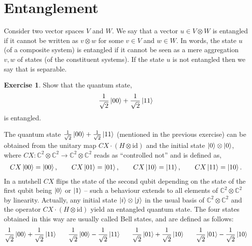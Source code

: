 \documentclass[a4paper, 11pt]{article}
\newcommand{\complex}{\mathbb{C}}
\newcommand{\id}{\mathrm{id}}
\theoremstyle{definition}
\newtheorem{exercise}{Exercise}
\begin{document}
\section{Entanglement}

Consider two vector spaces $V$ and $W$. We say that a vector
$u \in V \otimes W$ is entangled if it cannot be written as
$v \otimes w$ for some $v \in V$ and $w \in W$. In words, the state
$u$ (of a composite system) is entangled if it cannot be seen as a
mere aggregation $v, w$ of states (of the constituent systems). If the
state $u$ is not entangled then we say that is separable.

\begin{exercise}
  Show that the quantum state,
  \begin{align*}
    \frac{1}{\sqrt{2}} \ket{00} + \frac{1}{\sqrt{2}} \ket{11}
  \end{align*}
  is entangled.
\end{exercise}


The quantum state
$\frac{1}{\sqrt{2}} \ket{00} + \frac{1}{\sqrt{2}} \ket{11}$ (mentioned
in the previous exercise) can be obtained from the unitary map
$CX \cdot (H \otimes \id)$ and the initial state
$\ket{0} \otimes \ket{0}$, where
$CX : \complex^2 \otimes \complex^2 \to \complex^2 \otimes \complex^2$
reads as ``controlled not'' and is defined as,
\begin{align*}
  CX \ket{00} = \ket{00},
  \hspace{0.7cm}
  CX \ket{01} = \ket{01},
  \hspace{0.7cm}
  CX \ket{10} = \ket{11},
  \hspace{0.7cm}
  CX \ket{11} = \ket{10}.
\end{align*}
In a nutshell $CX$ flips the state of the second qubit depending on
the state of the first qubit being $\ket{0}$ or $\ket{1}$ -- such a
behaviour extends to all elements of $\complex^2 \otimes \complex^2$
by linearity. Actually, any initial state $\ket{i} \otimes \ket{j}$ in
the usual basis of $\complex^2 \otimes \complex^2$ and the operator
$CX \cdot (H \otimes \id)$ yield an entangled quantum state. The four
states obtained in this way are usually called Bell states, and are
defined as follows:
\begin{align*}
  \frac{1}{\sqrt{2}} \ket{00} + \frac{1}{\sqrt{2}} \ket{11}
  \hspace{0.6cm}
  \frac{1}{\sqrt{2}} \ket{00} - \frac{1}{\sqrt{2}} \ket{11}
  \hspace{0.6cm}
  \frac{1}{\sqrt{2}} \ket{01} + \frac{1}{\sqrt{2}} \ket{10}
  \hspace{0.6cm}
  \frac{1}{\sqrt{2}} \ket{01} - \frac{1}{\sqrt{2}} \ket{10}
\end{align*}




\end{document}
